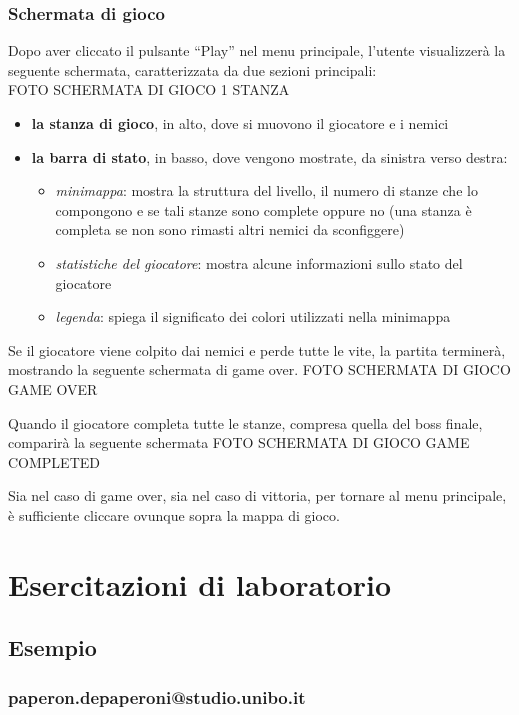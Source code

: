 \documentclass[a4paper,12pt]{report}
\begin{document}
\subsection*{Schermata di gioco}
Dopo aver cliccato il pulsante ``Play'' nel menu principale, l'utente visualizzerà la seguente schermata, caratterizzata da due sezioni principali:
\\{FOTO SCHERMATA DI GIOCO 1 STANZA}

\begin{itemize}
    \item \textbf{la stanza di gioco}, in alto, dove si muovono il giocatore e i nemici
    \item \textbf{la barra di stato}, in basso, dove vengono mostrate, da sinistra verso destra:
    \begin{itemize}
        \item \textit{minimappa}: mostra la struttura del livello, il numero di stanze che lo compongono e se tali stanze sono complete oppure no
        (una stanza è completa se non sono rimasti altri nemici da sconfiggere)
        \item \textit{statistiche del giocatore}: mostra alcune informazioni sullo stato del giocatore
        \item \textit{legenda}: spiega il significato dei colori utilizzati nella minimappa
    \end{itemize}
\end{itemize}

Se il giocatore viene colpito dai nemici e perde tutte le vite, la partita terminerà, mostrando la seguente schermata di game over.
{FOTO SCHERMATA DI GIOCO GAME OVER}

Quando il giocatore completa tutte le stanze, compresa quella del boss finale, comparirà la seguente schermata
{FOTO SCHERMATA DI GIOCO GAME COMPLETED}

Sia nel caso di game over, sia nel caso di vittoria, per tornare al menu principale, è sufficiente cliccare ovunque sopra la mappa di gioco.


\chapter{Esercitazioni di laboratorio}

\section*{Esempio}

\subsection{paperon.depaperoni@studio.unibo.it}
\end{document}
